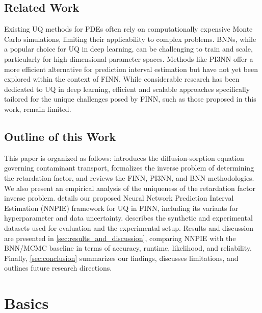 \section{Related Work}
Existing UQ methods for PDEs often rely on computationally expensive Monte Carlo simulations, limiting their applicability to complex problems. BNNs, while a popular choice for UQ in deep learning, can be challenging to train and scale, particularly for high-dimensional parameter spaces. Methods like PI3NN offer a more efficient alternative for prediction interval estimation but have not yet been explored within the context of FINN. While considerable research has been dedicated to UQ in deep learning, efficient and scalable approaches specifically tailored for the unique challenges posed by FINN, such as those proposed in this work, remain limited.



\section{Outline of this Work}
This paper is organized as follows:  introduces the diffusion-sorption equation governing contaminant transport, formalizes the inverse problem of determining the retardation factor, and reviews the FINN, PI3NN, and BNN methodologies. We also present an empirical analysis of the uniqueness of the retardation factor inverse problem.  details our proposed Neural Network Prediction Interval Estimation (NNPIE) framework for UQ in FINN, including its variants for hyperparameter and data uncertainty.  describes the synthetic and experimental datasets used for evaluation and the experimental setup. Results and discussion are presented in \cref{sec:results_and_discussion}, comparing NNPIE with the BNN/MCMC baseline in terms of accuracy, runtime, likelihood, and reliability. Finally, \cref{sec:conclusion} summarizes our findings, discusses limitations, and outlines future research directions.



\chapter{Basics}
\label{sec:basics}

